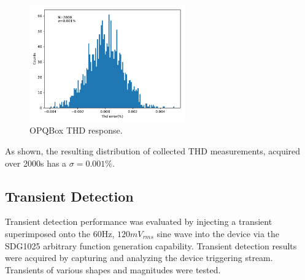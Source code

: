 \begin{figure}[ht!]
    \begin{center}
        \includegraphics[width=0.6\textwidth]{img/box_eval/thd_rms.pdf}
    \end{center}
    \caption{OPQBox THD response.}
    \label{fig:expdes:3}
\end{figure}

As shown, the resulting distribution of collected THD measurements, acquired over 2000s has a $\sigma=0.001\%$.

\subsection{Transient Detection}

Transient detection performance was evaluated by injecting a transient superimposed onto the 60Hz, $120mV_{rms}$ sine wave into the device via the SDG1025 arbitrary function generation capability.
Transient detection results were acquired by capturing and analyzing the device triggering stream.
Transients of various shapes and magnitudes were tested.

